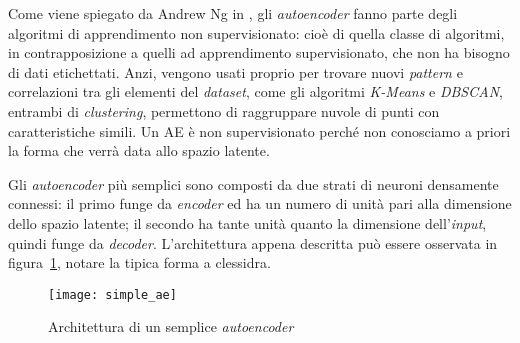 %


Come viene spiegato da Andrew Ng in \cite{ng_sparse_ae}, gli \textit{autoencoder} fanno parte degli algoritmi di apprendimento non supervisionato: cioè di quella classe di algoritmi, in contrapposizione a quelli ad apprendimento supervisionato, che non ha bisogno di dati etichettati.
Anzi, vengono usati proprio per trovare nuovi \textit{pattern} e correlazioni tra gli elementi del \textit{dataset}, come gli algoritmi \textit{K-Means} e \textit{DBSCAN}, entrambi di \textit{clustering}, permettono di raggruppare nuvole di punti con caratteristiche simili. %
Un AE è non supervisionato perché non conosciamo a priori la forma che verrà data allo spazio latente. %

Gli \textit{autoencoder} più semplici sono composti da due strati di neuroni densamente connessi: il primo funge da \textit{encoder} ed ha un numero di unità pari alla dimensione dello spazio latente; il secondo ha tante unità quanto la dimensione dell'\textit{input}, quindi funge da \textit{decoder}.
L'architettura appena descritta può essere osservata in figura~\ref{fig:semplice_ae}, notare la tipica forma a clessidra.

\begin{figure}[ht] %
  \begin{center}
    \centering\texttt{[image: simple\_ae]}
  \end{center}
  \caption{Architettura di un semplice \textit{autoencoder}}
  \label{fig:semplice_ae}
\end{figure}

